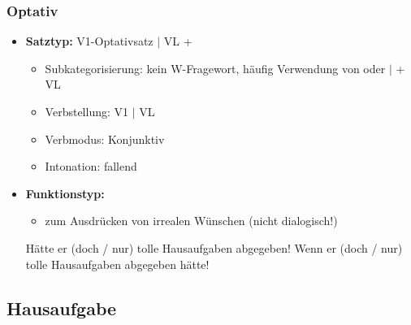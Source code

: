 \begin{frame}
\frametitle{Optativ}

\begin{itemize}
	\item \textbf{Satztyp:} V1-Optativsatz $|$ VL + 
	\begin{itemize}
		\item Subkategorisierung: kein W-Fragewort, häufig Verwendung von  oder  $|$  + VL
		\item Verbstellung: V1 $|$ VL
		\item Verbmodus: Konjunktiv
		\item Intonation: fallend
	\end{itemize}
	\item \textbf{Funktionstyp:}
	\begin{itemize}
		\item zum Ausdrücken von irrealen Wünschen (nicht dialogisch!)
	\end{itemize}
	
	\eal
	\ex Hätte er (doch / nur) tolle Hausaufgaben abgegeben! 
	\ex Wenn er (doch / nur) tolle Hausaufgaben abgegeben hätte!
	\zl
		
\end{itemize}

\end{frame}


\subsection{Hausaufgabe}


